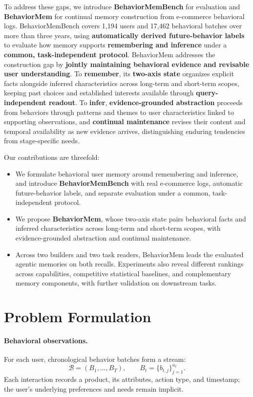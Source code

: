 \documentclass[sigconf,nonacm,balance=false]{acmart}
\begin{document}
To address these gaps, we introduce \textbf{BehaviorMemBench} for evaluation and \textbf{BehaviorMem} for continual memory construction from e-commerce behavioral logs. BehaviorMemBench covers 1{,}194 users and 17{,}462 behavioral batches over more than three years, using \textbf{automatically derived future-behavior labels} to evaluate how memory supports \textbf{remembering and inference} under a \textbf{common, task-independent protocol}. BehaviorMem addresses the construction gap by \textbf{jointly maintaining behavioral evidence and revisable user understanding}. To \textbf{remember}, its \textbf{two-axis state} organizes explicit facts alongside inferred characteristics across long-term and short-term scopes, keeping past choices and established interests available through \textbf{query-independent readout}. To \textbf{infer}, \textbf{evidence-grounded abstraction} proceeds from behaviors through patterns and themes to user characteristics linked to supporting observations, and \textbf{continual maintenance} revises their content and temporal availability as new evidence arrives, distinguishing enduring tendencies from stage-specific needs.




Our contributions are threefold:
\begin{itemize}
    \item We formulate behavioral user memory around remembering and inference, and introduce \textbf{BehaviorMemBench} with real e-commerce logs, automatic future-behavior labels, and separate evaluation under a common, task-independent protocol.
    \item We propose \textbf{BehaviorMem}, whose two-axis state pairs behavioral facts and inferred characteristics across long-term and short-term scopes, with evidence-grounded abstraction and continual maintenance.
    \item Across two builders and two task readers, BehaviorMem leads the evaluated agentic memories on both recalls. Experiments also reveal different rankings across capabilities, competitive statistical baselines, and complementary memory components, with further validation on downstream tasks.
\end{itemize}

\section{Problem Formulation}
\label{sec:problem-formulation}

\paragraph{\textbf{Behavioral observations.}}
For each user, chronological behavior batches form a stream:
\begin{equation*}
    \mathcal{B}=(B_1,\ldots,B_T),\qquad B_t=\{b_{t,j}\}_{j=1}^{n_t}.
\end{equation*}
Each interaction records a product, its attributes, action type, and timestamp; the user's underlying preferences and needs remain implicit.
\end{document}
